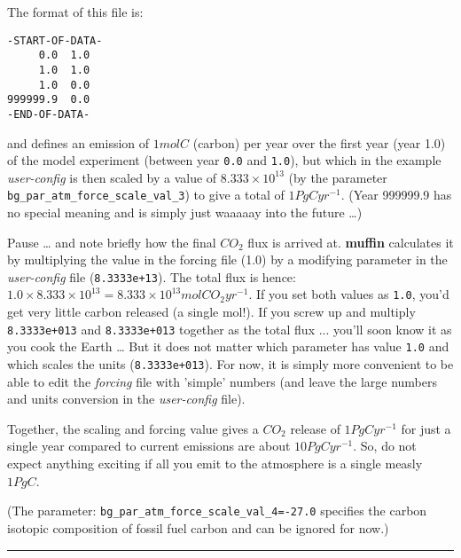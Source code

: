 \documentclass[11pt,fleqn]{book} %
\begin{document}
\vspace{2pt}
\noindent The format of this file is:
\vspace{-2pt}\small\begin{verbatim}
-START-OF-DATA-
     0.0  1.0
     1.0  1.0
     1.0  0.0
999999.9  0.0
-END-OF-DATA-
\end{verbatim}\normalsize\vspace{-2pt}

\noindent and defines an emission of \(1 mol C\) (carbon) per year over the first year (year 1.0) of the model experiment (between year \texttt{0.0} and \texttt{1.0}), but which in the example \textit{user-config} is then scaled by a value of \(8.333\times10^{13}\) (by the parameter \texttt{bg\_par\_atm\_force\_scale\_val\_3}) to give a total of \(1 PgC yr^{-1}\). (Year 999999.9 has no special meaning and is simply just waaaaay into the future …)

Pause … and note briefly how the final \(CO_{2}\) flux is arrived at. \textbf{muffin} calculates it by multiplying the value in the forcing file (1.0) by a modifying parameter in the \textit{user-config} file (\texttt{8.3333e+13}). The total flux is hence: \(1.0 \times 8.333\times10^{13} = 8.333\times10^{13} mol CO_{2} yr^{-1}\). If you set both values as \texttt{1.0}, you’d get very little carbon released (a single mol!). If you screw up and multiply \texttt{8.3333e+013} and \texttt{8.3333e+013} together as the total flux ... you’ll soon know it as you cook the Earth … But it does not matter which parameter has value \texttt{1.0} and which scales the units (\texttt{8.3333e+013}). For now, it is simply more convenient to be able to edit the \textit{forcing} file with 'simple' numbers (and leave the large numbers and units conversion in the \textit{user-config} file).

Together, the scaling and forcing value gives a \(CO_{2}\) release of \(1 PgC yr^{-1}\) for just a single year compared to current emissions are about \(10 PgC yr^{-1}\). So, do not expect anything exciting if all you emit to the atmosphere is a single measly \(1 PgC\).

(The parameter: \texttt{bg\_par\_atm\_force\_scale\_val\_4=-27.0} specifies the carbon isotopic composition of fossil fuel carbon and can be ignored for now.)

\vspace{1mm}
\noindent\rule{4cm}{0.1mm}
\vspace{2mm}
\end{document}
